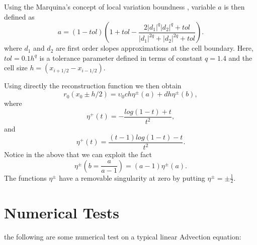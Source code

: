 \documentclass[10pt,a4paper]{article}
\begin{document}
Using the Marquina's concept of local variation boundness \citep{Artebrant2006}, variable $a$ is then defined as
%
\begin{equation}
	a = (1-tol)\left( 1+tol-\frac{2|d_1|^{q}|d_2|^{q}+tol}{|d_1|^{2q}+|d_2|^{2q}+tol} \right).
\end{equation}
%
where $d_1$ and $d_2$ are first order slopes approximations at the cell boundary. Here, $tol=0.1 h^q$ is a tolerance parameter defined in terms of constant $q=1.4$ and the cell size $h=(x_{i+1/2}-x_{i-1/2})$.


Using directly the reconstruction function we then obtain
%
\begin{equation}
	r_0(x_0\pm h/2) = \upsilon_0 ch\eta^{\pm}(a) + dh\eta^{\pm}(b),
\end{equation}
%
where
%
\begin{equation}
	\eta^{+}(t) = -\frac{log(1-t)+t}{t^2},
\end{equation}
%
and
%
\begin{equation}
	\eta^{+}(t) = \frac{(t-1)log(1-t)-t}{t^2}.
\end{equation}
%
Notice in the above that we can exploit the fact 
%
\begin{equation}
	\eta^{\pm} \left( b=\frac{a}{a-1}\right) = (a-1)\eta^{\pm}(a).
\end{equation}
%
The functions $\eta^{\pm}$ have a removable singularity at zero by putting $\eta^{\pm} = \pm \frac{1}{2}$. 

\section{Numerical Tests}
\label{sec:NumericalTests}

the following are some numerical test on a typical linear Advection equation:
\end{document}

